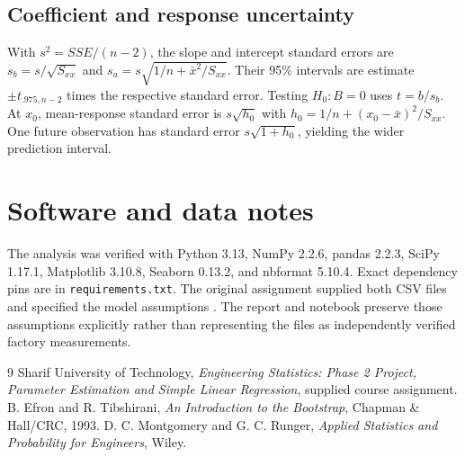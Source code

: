 \documentclass[11pt,a4paper]{article}
\begin{document}
\subsection*{Coefficient and response uncertainty}
With $s^2=SSE/(n-2)$, the slope and intercept standard errors are $s_b=s/\sqrt{S_{xx}}$ and $s_a=s\sqrt{1/n+\bar x^2/S_{xx}}$. Their 95\% intervals are estimate $\pm t_{.975,n-2}$ times the respective standard error. Testing $H_0:B=0$ uses $t=b/s_b$. At $x_0$, mean-response standard error is $s\sqrt{h_0}$ with $h_0=1/n+(x_0-\bar x)^2/S_{xx}$. One future observation has standard error $s\sqrt{1+h_0}$, yielding the wider prediction interval.

\section{Software and data notes}
The analysis was verified with Python 3.13, NumPy 2.2.6, pandas 2.2.3, SciPy 1.17.1, Matplotlib 3.10.8, Seaborn 0.13.2, and nbformat 5.10.4. Exact dependency pins are in \texttt{requirements.txt}. The original assignment supplied both CSV files and specified the model assumptions \cite{assignment}. The report and notebook preserve those assumptions explicitly rather than representing the files as independently verified factory measurements.

\begin{thebibliography}{9}
 Sharif University of Technology, \emph{Engineering Statistics: Phase 2 Project, Parameter Estimation and Simple Linear Regression}, supplied course assignment.
 B. Efron and R. Tibshirani, \emph{An Introduction to the Bootstrap}, Chapman \& Hall/CRC, 1993.
 D. C. Montgomery and G. C. Runger, \emph{Applied Statistics and Probability for Engineers}, Wiley.
\end{thebibliography}
\end{document}

